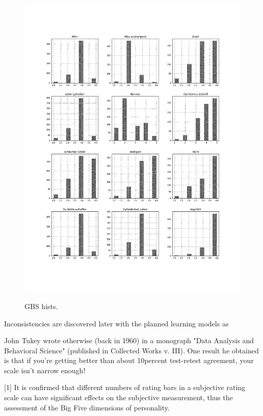 \begin{figure}[ht]
	\begin{center}
		\includegraphics[scale=0.30,angle=0]{fig/gbs_hist}
		\label{std}
		\caption{GBS hists.}
	\end{center}
\end{figure}

Inconsistencies are discovered later with the planned learning models as 

John Tukey wrote otherwise (back in 1960) in a monograph "Data Analysis and Behavioral Science" (published in Collected Works v. III). One result he obtained is that if you're getting better than about 10percent test-retest agreement, your scale isn't narrow enough!

[1] It is confirmed that different numbers of rating bars in a subjective rating scale can have significant effects on the subjective measurement, thus the assessment of the Big Five dimensions of personality.

